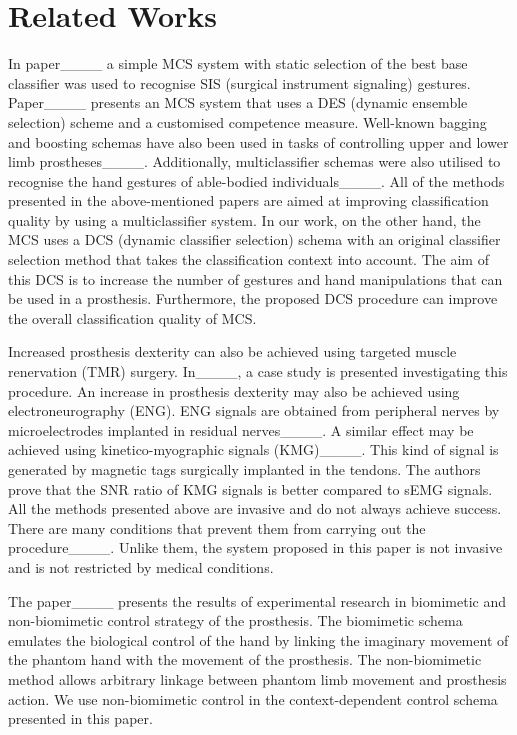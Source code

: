 \section{Related Works}
\label{sec:RelWorks} 

In paper____ a simple MCS system with static selection of the best base classifier was used to recognise SIS (surgical instrument signaling) gestures. Paper____ presents an MCS system that uses a DES (dynamic ensemble selection) scheme and a customised competence measure. Well-known bagging and boosting schemas have also been used in tasks of controlling upper and lower limb prostheses____. Additionally, multiclassifier schemas were also utilised to recognise the hand gestures of able-bodied individuals____. All of the methods presented in the above-mentioned papers are aimed at improving classification quality by using a multiclassifier system. In our work, on the other hand, the MCS uses a DCS (dynamic classifier selection) schema with an original classifier selection method that takes the classification context into account. The aim of this DCS is to increase the number of gestures and hand manipulations that can be used in a prosthesis. Furthermore, the proposed DCS procedure can improve the overall classification quality of MCS.

Increased prosthesis dexterity can also be achieved using targeted muscle renervation (TMR) surgery. In____, a case study is presented investigating this procedure. An increase in prosthesis dexterity may also be achieved using electroneurography (ENG). ENG signals are obtained from peripheral nerves by microelectrodes implanted in residual nerves____. A similar effect may be achieved using kinetico-myographic signals (KMG)____. This kind of signal is generated by magnetic tags surgically implanted in the tendons. The authors prove that the SNR ratio of KMG signals is better compared to sEMG signals. All the methods presented above are invasive and do not always achieve success. There are many conditions that prevent them from carrying out the procedure____. Unlike them, the system proposed in this paper is not invasive and is not restricted by medical conditions.

The paper____ presents the results of experimental research in biomimetic and non-biomimetic control strategy of the prosthesis. The biomimetic schema emulates the biological control of the hand by linking the imaginary movement of the phantom hand with the movement of the prosthesis. The non-biomimetic method allows arbitrary linkage between phantom limb movement and prosthesis action. We use non-biomimetic control in the context-dependent control schema presented in this paper.

